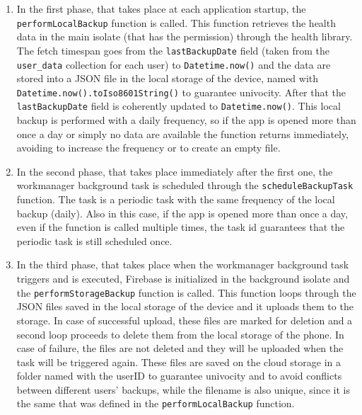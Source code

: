 \begin{enumerate}[nosep] %
    \item In the first phase, that takes place at each application startup, the \newline \texttt{performLocalBackup} function is called. This function retrieves the health data in the main isolate (that has the permission) through the health library. The fetch timespan goes from the \texttt{lastBackupDate} field (taken from the \texttt{user\_data} collection for each user) to \texttt{Datetime.now()} and the data are stored into a JSON file in the local storage of the device, named with \texttt{Datetime.now().toIso8601String()} to guarantee univocity. After that the \texttt{lastBackupDate} field is coherently updated to \texttt{Datetime.now()}. This local backup is performed with a daily frequency, so if the app is opened more than once a day or simply no data are available the function returns immediately, avoiding to increase the frequency or to create an empty file.
    \item In the second phase, that takes place immediately after the first one, the workmanager background task is scheduled through the \texttt{scheduleBackupTask} function. The task is a periodic task with the same frequency of the local backup (daily). Also in this case, if the app is opened more than once a day, even if the function is called multiple times, the task id guarantees that the periodic task is still scheduled once.
    \item In the third phase, that takes place when the workmanager background task triggers and is executed, Firebase is initialized in the background isolate and the \texttt{performStorageBackup} function is called. This function loops through the JSON files saved in the local storage of the device and it uploads them to the storage. In case of successful upload, these files are marked for deletion and a second loop proceeds to delete them from the local storage of the phone. In case of failure, the files are not deleted and they will be uploaded when the task will be triggered again. These files are saved on the cloud storage in a folder named with the userID to guarantee univocity and to avoid conflicts between different users' backups, while the filename is also unique, since it is the same that was defined in the \texttt{performLocalBackup} function.
\end{enumerate}

